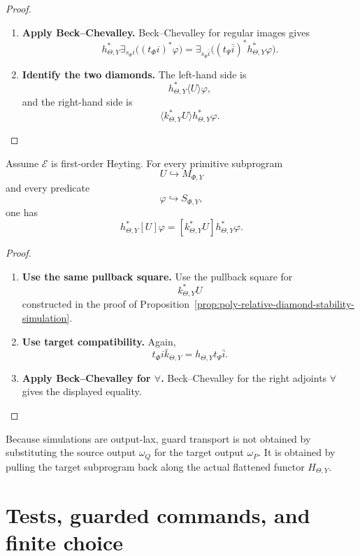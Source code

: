 \begin{proof}
\begin{enumerate}
\item \textbf{Apply Beck--Chevalley.}
Beck--Chevalley for regular images gives
\[
h_{\Theta,Y}^\ast
\exists_{s_\Phi i}\bigl((t_\Phi i)^\ast\varphi\bigr)
=
\exists_{s_\Psi\bar i}
\bigl((t_\Psi\bar i)^\ast h_{\Theta,Y}^\ast\varphi\bigr).
\]

\item \textbf{Identify the two diamonds.}
The left-hand side is
\[
h_{\Theta,Y}^\ast\langle U\rangle\varphi,
\]
and the right-hand side is
\[
\langle k_{\Theta,Y}^\ast U\rangle h_{\Theta,Y}^\ast\varphi.
\]
\end{enumerate}
\end{proof}

\begin{proposition}
\label{prop:poly-relative-box-stability-simulation}
Assume \(\mathcal E\) is first-order Heyting.  For every primitive subprogram
\[
U\hookrightarrow M_{\Phi,Y}
\]
and every predicate
\[
\varphi\hookrightarrow S_{\Phi,Y},
\]
one has
\[
h_{\Theta,Y}^\ast[U]\varphi
=
[k_{\Theta,Y}^\ast U]h_{\Theta,Y}^\ast\varphi.
\]
\end{proposition}

\begin{proof}
\leavevmode
\begin{enumerate}
\item \textbf{Use the same pullback square.}
Use the pullback square for
\[
k_{\Theta,Y}^\ast U
\]
constructed in the proof of
Proposition~\ref{prop:poly-relative-diamond-stability-simulation}.

\item \textbf{Use target compatibility.}
Again,
\[
t_\Phi i\bar k_{\Theta,Y}=h_{\Theta,Y}t_\Psi\bar i.
\]

\item \textbf{Apply Beck--Chevalley for \(\forall\).}
Beck--Chevalley for the right adjoints \(\forall\) gives the displayed
equality.
\end{enumerate}
\end{proof}

\begin{remark}
\label{rem:poly-relative-simulation-stability-meaning}
Because simulations are output-lax, guard transport is not obtained by
substituting the source output \(\omega_Q\) for the target output
\(\omega_P\).  It is obtained by pulling the target subprogram back along the
actual flattened functor \(H_{\Theta,Y}\).
\end{remark}

\section{Tests, guarded commands, and finite choice}
\label{sec:poly-relative-tests-choice}

